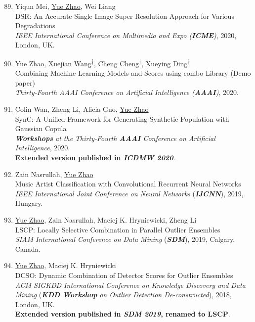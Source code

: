 \documentclass[margin,line,pifont,palatino,courier]{res}
\newcommand{\equalcontrib}{\textsuperscript{$\dagger$}}
\newenvironment{benumerate}[1]{
    \let\oldItem\item
    \def\item{\addtocounter{enumi}{-2}\oldItem}
    \begin{enumerate}[leftmargin=0.25in,label=\textcolor{uscred}{\arabic*.}]
    \setcounter{enumi}{#1}
    \addtocounter{enumi}{1}
}{
    \end{enumerate}
}
\begin{document}
\begin{resume}
\begin{benumerate}{88}
    \item Yiqun Mei, \underline{Yue Zhao}, Wei Liang \\
    DSR: An Accurate Single Image Super Resolution Approach for Various Degradations\\
    \textit{IEEE International Conference on Multimedia and Expo (\textbf{ICME})}, 2020, London, UK.

    \item \underline{Yue Zhao}, Xuejian Wang\equalcontrib, Cheng Cheng\equalcontrib, Xueying Ding\equalcontrib \\
    Combining Machine Learning Models and Scores using combo Library (Demo paper) \\
    \textit{Thirty-Fourth AAAI Conference on Artificial Intelligence (\textbf{AAAI})}, 2020.


    \item Colin Wan, Zheng Li, Alicia Guo, \underline{Yue Zhao} \\
    SynC: A Unified Framework for Generating Synthetic Population with Gaussian Copula \\
    \textit{\textbf{Workshops} at the Thirty-Fourth \textbf{AAAI} Conference on Artificial Intelligence}, 2020. \\
    \textbf{Extended version published in \textit{ICDMW 2020}}.
    
    \item Zain Nasrullah, \underline{Yue Zhao} \\
    Music Artist Classification with Convolutional Recurrent Neural Networks \\
    \textit{IEEE International Joint Conference on Neural Networks} (\textbf{\textit{IJCNN}}), 2019, Hungary.
    
    \item \underline{Yue Zhao}, Zain Nasrullah, Maciej K. Hryniewicki, Zheng Li \\
    LSCP: Locally Selective Combination in Parallel Outlier Ensembles \\
    \textit{SIAM International Conference on Data Mining} (\textbf{\textit{SDM}}), 2019, Calgary, Canada. 

    \item \underline{Yue Zhao}, Maciej K. Hryniewicki \\
    DCSO: Dynamic Combination of Detector Scores for Outlier Ensembles \\
    \textit{ACM SIGKDD International Conference on Knowledge Discovery and Data Mining} (\textbf{\textit{KDD Workshop}} \textit{on Outlier Detection De-constructed}), 2018, London, UK. \\
    \textbf{Extended version published in \textit{SDM 2019}, renamed to LSCP}.


\end{benumerate}
\end{resume}
\end{document}
